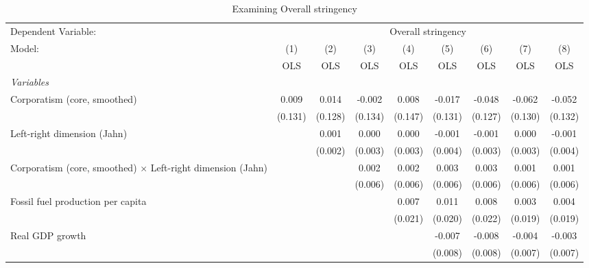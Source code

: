 
\begin{table}[htbp]
   \caption{Examining Overall stringency}
   \centering
   \begin{tabular}{lcccccccc}
      \toprule
      Dependent Variable: & \multicolumn{8}{c}{Overall stringency}\\
      Model:                                                             & (1)     & (2)     & (3)     & (4)     & (5)     & (6)     & (7)     & (8)\\  
                                                                         &  OLS    & OLS     & OLS     & OLS     & OLS     & OLS     & OLS     & OLS\\  
      \midrule
      \emph{Variables}\\
      Corporatism (core, smoothed)                                       & 0.009   & 0.014   & -0.002  & 0.008   & -0.017  & -0.048  & -0.062  & -0.052\\   
                                                                         & (0.131) & (0.128) & (0.134) & (0.147) & (0.131) & (0.127) & (0.130) & (0.132)\\   
      Left-right dimension (Jahn)                                        &         & 0.001   & 0.000   & 0.000   & -0.001  & -0.001  & 0.000   & -0.001\\   
                                                                         &         & (0.002) & (0.003) & (0.003) & (0.004) & (0.003) & (0.003) & (0.004)\\   
      Corporatism (core, smoothed) $\times$ Left-right dimension (Jahn)  &         &         & 0.002   & 0.002   & 0.003   & 0.003   & 0.001   & 0.001\\   
                                                                         &         &         & (0.006) & (0.006) & (0.006) & (0.006) & (0.006) & (0.006)\\   
      Fossil fuel production per capita                                  &         &         &         & 0.007   & 0.011   & 0.008   & 0.003   & 0.004\\   
                                                                         &         &         &         & (0.021) & (0.020) & (0.022) & (0.019) & (0.019)\\   
      Real GDP growth                                                    &         &         &         &         & -0.007  & -0.008  & -0.004  & -0.003\\   
                                                                         &         &         &         &         & (0.008) & (0.008) & (0.007) & (0.007)\\   

\end{tabular}
\end{table}

